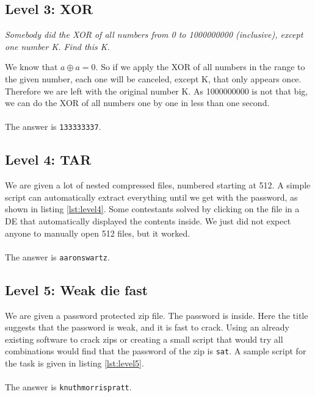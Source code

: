 \documentclass[paper=a4, fontsize=11pt]{scrartcl}	%
\begin{document}
\subsection*{Level 3: XOR}
\textit{Somebody did the XOR of all numbers from 0 to 1000000000 (inclusive), except one number K. Find this K.}

We know that $a \oplus a = 0$. So if we apply the XOR of all numbers in the range to the given number, each one will be canceled, except K, that only appears once. Therefore we are left with the original number K. As 1000000000 is not that big, we can do the XOR of all numbers one by one in less than one second.
\\
\\
The answer is \texttt{133333337}.



\subsection*{Level 4: TAR}
We are given a lot of nested compressed files, numbered starting at 512. A simple script can automatically extract everything until we get with the password, as shown in listing \ref{lst:level4}. Some contestants solved by clicking on the file in a DE that automatically displayed the contents inside. We just did not expect anyone to manually open 512 files, but it worked.
\\
\\
The answer is \texttt{aaronswartz}.



\subsection*{Level 5: Weak die fast}
We are given a password protected zip file. The password is inside. Here the title suggests that the password is weak, and it is fast to crack. Using an already existing software to crack zips or creating a small script that would try all combinations would find that the password of the zip is \texttt{sat}. A sample script for the task is given in listing \ref{lst:level5}.
\\
\\
The answer is \texttt{knuthmorrispratt}.

\end{document}
